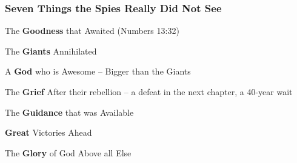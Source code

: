 \subsubsection{Seven Things the Spies Really Did Not See}

\begin{compactenum}[I.]
   \item The \textbf{Goodness} that Awaited     (Numbers 13:32) 
   \item The \textbf{Giants} Annihilated
   \item A \textbf{God} who is Awesome -- Bigger than the Giants 
   \item The \textbf{Grief} After their rebellion -- a defeat in the next chapter, a 40-year wait
   \item The \textbf{Guidance} that was Available
   \item  \textbf{Great} Victories Ahead
   \item The \textbf{Glory} of God Above all Else
\end{compactenum}